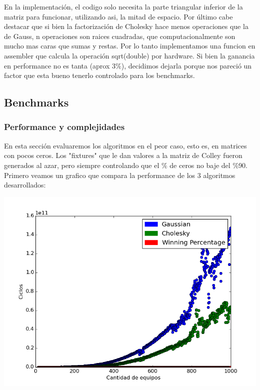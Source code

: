 En la implementación, el codigo solo necesita la parte triangular inferior de la matriz para funcionar, utilizando asi, la mitad de espacio. Por último cabe destacar que si bien la factorización de Cholesky hace menos operaciones que la de Gauss, n operaciones son raices cuadradas, que computacionalmente son mucho mas caras que sumas y restas. Por lo tanto implementamos una funcion en assembler que calcula la operación sqrt(double) por hardware. Si bien la ganancia en performance no es tanta (aprox 3$\%$), decidimos dejarla porque nos pareció un factor que esta bueno tenerlo controlado para los benchmarks.


\subsection{Benchmarks}

\subsubsection{Performance y complejidades}

 En esta sección evaluaremos los algoritmos en el peor caso, esto es, en matrices con pocos ceros. Los "fixtures" que le dan valores a la matriz de Colley fueron generados al azar, pero siempre controlando que el $\%$ de ceros no baje del $\%$90.
 Primero veamos un grafico que compara la performance de los 3 algoritmos desarrollados:
 
 \includegraphics[scale=0.8]{img/testciclos.png}
 
